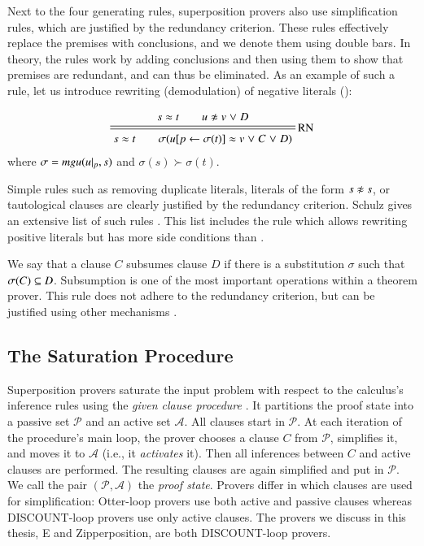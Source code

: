 Next to the four generating rules, superposition provers also use
simplification rules, which are justified by the redundancy criterion. These
rules effectively replace the pre\-mises with conclusions, and we denote them
using double bars. In theory, the rules work by adding conclusions and then
using them to show that premises are redundant, and can thus be eliminated. As
an example of such a rule, let us introduce rewriting (demodulation) of negative
literals ():

\[
\namedsimp{RN}{s \eq t \qquad u \noteq v \llor D}
              {s \eq t \qquad \sigmacl{u[p \leftarrow \sigma(t)] \eq v \llor C \llor D}}
\]
where $\sigma = \mathit{mgu}(u|_p, s)$ and $\sigma(s) \succ \sigma(t)$.


Simple rules such as removing duplicate literals, literals of the form $s \noteq
s$, or tautological clauses are clearly justified by the redundancy criterion.
Schulz gives an extensive list of such rules \cite{ss-02-brainiac}. This list
includes the rule which allows rewriting positive literals but has more side
conditions than .

We say that a clause $C$ subsumes clause $D$ if there is a substitution $\sigma$
such that $\sigma(C) \subseteq D$. Subsumption is one of the most important
operations within a theorem prover. This rule does not adhere to the redundancy
criterion, but can be justified using other mechanisms \cite{wtrb-20-sat-framework}.

\subsection{The Saturation Procedure}
\label{sec:pre:saturation}

Superposition provers saturate the input problem with respect to the calculus's
inference rules using the \emph{given clause procedure}
\cite{mcw-1997-otter,adf-1995-discount}. It partitions the proof state into a
passive set $\mathcal{P}$ and an active set $\mathcal{A}$. All clauses start in
$\mathcal{P}$. At each iteration of the procedure's main loop, the prover
chooses a clause $C$ from $\mathcal{P}$, simplifies it, and moves it to
$\mathcal{A}$ (i.e., it \emph{activates} it). Then all inferences between $C$ and active clauses are performed.
The resulting clauses are again simplified and put in $\mathcal{P}$.
We call the pair $(\mathcal{P}, \mathcal{A})$ the \emph{proof state}.
Provers differ in which clauses are used for simplification: Otter-loop
\cite{mcw-1997-otter} provers use both active and passive clauses whereas
DISCOUNT-loop \cite{adf-1995-discount} provers use only active clauses.
The provers we discuss in this thesis, E and Zipperposition, are both DISCOUNT-loop provers.

